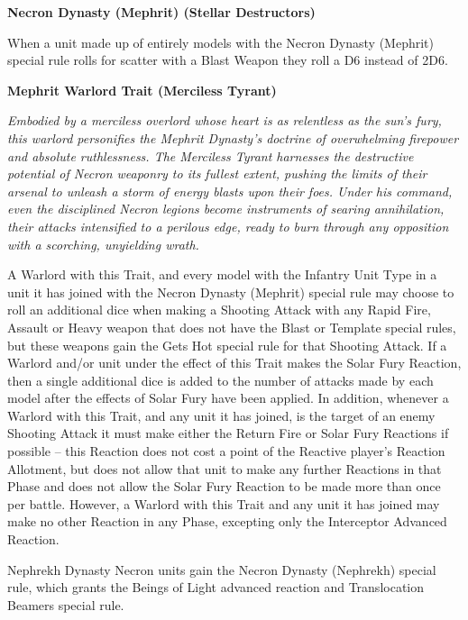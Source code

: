 \begin{multicols}{2}
	\textbf{Necron Dynasty (Mephrit) (Stellar Destructors)} 
	
	When a unit made up of entirely models with the Necron Dynasty (Mephrit) special rule rolls for scatter with a Blast Weapon they roll a D6 instead of 2D6.
	
	\textbf{Mephrit Warlord Trait (Merciless Tyrant)}
	
	\textit{Embodied by a merciless overlord whose heart is as relentless as the sun's fury, this warlord personifies the Mephrit Dynasty’s doctrine of overwhelming firepower and absolute ruthlessness. The Merciless Tyrant harnesses the destructive potential of Necron weaponry to its fullest extent, pushing the limits of their arsenal to unleash a storm of energy blasts upon their foes. Under his command, even the disciplined Necron legions become instruments of searing annihilation, their attacks intensified to a perilous edge, ready to burn through any opposition with a scorching, unyielding wrath.}
	
	A Warlord with this Trait, and every model with the Infantry Unit Type in a unit it has joined with the Necron Dynasty (Mephrit) special rule may choose to roll an additional dice when making a Shooting Attack with any Rapid Fire, Assault or Heavy weapon that does not have the Blast or Template special rules, but these weapons gain the Gets Hot special rule for that Shooting Attack. If a Warlord and/or unit under the effect of this Trait makes the Solar Fury Reaction, then a single additional dice is added to the number of attacks made by each model after the effects of Solar Fury have been applied. In addition, whenever a Warlord with this Trait, and any unit it has joined, is the target of an enemy Shooting Attack it must make either the Return Fire or Solar Fury Reactions if possible – this Reaction does not cost a point of the Reactive player’s Reaction Allotment, but does not allow that unit to make any further Reactions in that Phase and does not allow the Solar Fury Reaction to be made more than once per battle. However, a Warlord with this Trait and any unit it has joined may make no other Reaction in any Phase, excepting only the Interceptor Advanced Reaction.
\end{multicols}


\newpage
{}

Nephrekh Dynasty Necron units gain the Necron Dynasty (Nephrekh) special rule, which grants the Beings of Light advanced reaction and Translocation Beamers special rule.

